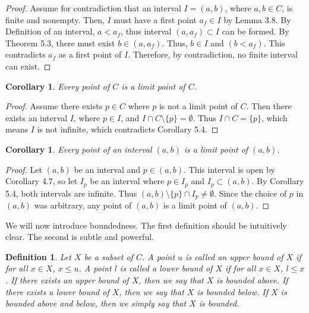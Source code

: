 \documentclass{amsart}
\newtheorem{definition}[theorem]{Definition}
\newtheorem{corollary}[theorem]{Corollary}
\newcommand{\1}{\mathds{1}}
\numberwithin{equation}{section}
\numberwithin{theorem}{section}
\begin{document}
\begin{proof}
	Assume for contradiction that an interval $I = (a,b)$, where $a,b\in C$, is finite and nonempty. Then, $I$ must have a first point $a_f\in I$ by Lemma 3.8. By Definition of an interval, $a<a_f$, thus interval $(a,a_f)\subset I$ can be formed. By Theorem 5.3, there must exist $b\in (a,a_f)$. Thus, $b\in I$ and $(b<a_f)$. This contradicts $a_f$ as a first point of $I$. Therefore, by contradiction, no finite interval can exist. 
\end{proof}

\begin{corollary}  Every point of $C$ is a limit point of $C$.  
\end{corollary}

\begin{proof}
	Assume there exists $p\in C$ where $p$ is not a limit point of $C$. Then there exists an interval $I$, where $p\in I$, and $I\cap C\setminus\{p\}=\emptyset$. Thus $I\cap C= \{p\}$, which means $I$ is not infinite, which contradicts Corollary 5.4.
\end{proof}

\begin{corollary} 
Every point of an interval $(a,b)$ is a limit point of $(a,b)$.
\end{corollary}

\begin{proof}
	Let $(a,b)$ be an interval and $p\in (a,b)$. This interval is open by Corollary 4.7, so let $I_p$ be an interval where $p\in I_p$ and $I_p\subset (a,b)$.  By Corollary 5.4, both intervals are infinite. Thus $(a,b)\setminus\{p\}\cap I_p \not= \emptyset$. Since the choice of $p$ in $(a,b)$ was arbitrary, any point of $(a,b)$ is a limit point of $(a,b)$.
\end{proof}

We will now introduce boundedness.   The first definition should be intuitively clear.  The second is subtle and powerful.  


\begin{definition}  Let $X$ be a subset of $C$.  A point $u$ is called an \emph{upper bound} of $X$ if for all $x \in X$, $x \leq u$.  A point $l$ is called a \emph{lower bound} of $X$ if for all $x \in X$, $l \leq x$.  If there exists an upper bound of $X$, then we say that $X$ is \emph{bounded above}.  If there exists a lower bound of $X$, then we say that $X$ is \emph{bounded below}.  If $X$ is bounded above and below, then we simply say that $X$ is \emph{bounded}.
\end{definition}
\end{document}
